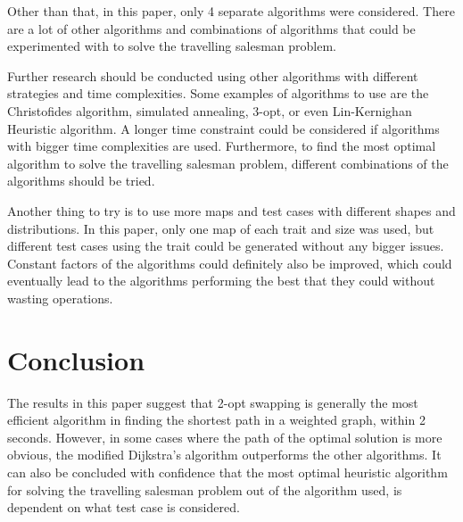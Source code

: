 \documentclass{article}
\begin{document}
\noindent
Other than that, in this paper, only 4 separate algorithms were considered. There are a lot of other algorithms and combinations of algorithms that could be experimented with to solve the travelling salesman problem.

\noindent
Further research should be conducted using other algorithms with different strategies and time complexities. Some examples of algorithms to use are the Christofides algorithm, simulated annealing, 3-opt, or even Lin-Kernighan Heuristic algorithm. A longer time constraint could be considered if algorithms with bigger time complexities are used. Furthermore, to find the most optimal algorithm to solve the travelling salesman problem, different combinations of the algorithms should be tried. 

\noindent
Another thing to try is to use more maps and test cases with different shapes and distributions. In this paper, only one map of each trait and size was used, but different test cases using the trait could be generated without any bigger issues. Constant factors of the algorithms could definitely also be improved, which could eventually lead to the algorithms performing the best that they could without wasting operations.

\newpage

\section{Conclusion}\label{sec5}
The results in this paper suggest that 2-opt swapping is generally the most efficient algorithm in finding the shortest path in a weighted graph, within 2 seconds. However, in some cases where the path of the optimal solution is more obvious, the modified Dijkstra's algorithm outperforms the other algorithms. It can also be concluded with confidence that the most optimal heuristic algorithm for solving the travelling salesman problem out of the algorithm used, is dependent on what test case is considered.


\newpage

 \label{sec6}


\newpage
\end{document}
